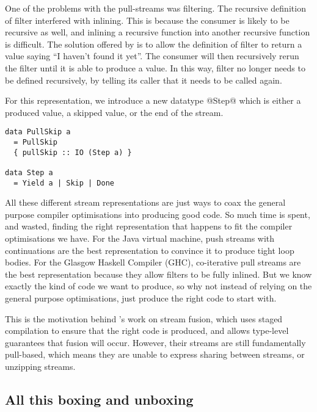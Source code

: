 One of the problems with the pull-streams was filtering.
The recursive definition of filter interfered with inlining.
This is because the consumer is likely to be recursive as well, and inlining a recursive function into another recursive function is difficult.
The solution offered by \citet{coutts2007stream} is to allow the definition of filter to return a value saying ``I haven't found it yet''.
The consumer will then recursively rerun the filter until it is able to produce a value.
In this way, filter no longer needs to be defined recursively, by telling its caller that it needs to be called again.

For this representation, we introduce a new datatype @Step@ which is either a produced value, a skipped value, or the end of the stream.

\begin{lstlisting}
data PullSkip a
  = PullSkip
  { pullSkip :: IO (Step a) }

data Step a
  = Yield a | Skip | Done
\end{lstlisting}

All these different stream representations are just ways to coax the general purpose compiler optimisations into producing good code.
So much time is spent, and wasted, finding the right representation that happens to fit the compiler optimisations we have.
For the Java virtual machine, push streams with continuations are the best representation to convince it to produce tight loop bodies.
For the Glasgow Haskell Compiler (GHC), co-iterative pull streams are the best representation because they allow filters to be fully inlined.
But we know exactly the kind of code we want to produce, so why not instead of relying on the general purpose optimisations, just produce the right code to start with.

This is the motivation behind \citet{kiselyov2016stream}'s work on stream fusion, which uses staged compilation to ensure that the right code is produced, and allows type-level guarantees that fusion will occur.
However, their streams are still fundamentally pull-based, which means they are unable to express sharing between streams, or unzipping streams.

\subsection{All this boxing and unboxing}

